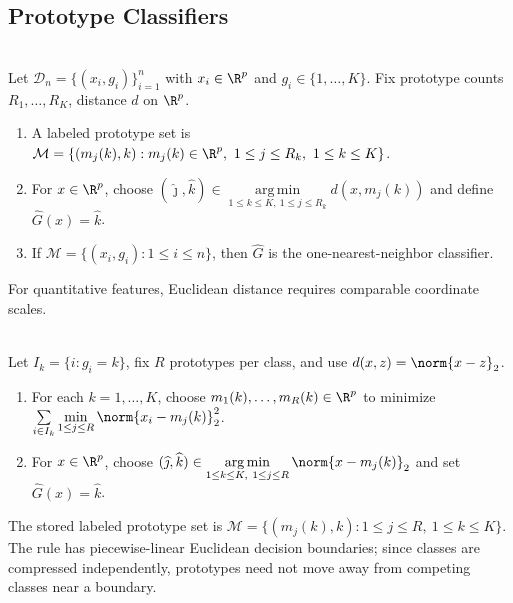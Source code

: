 \subsection{Prototype Classifiers}

\begin{definition} \label{def:sl-prototype-classifier} \\
Let $\mathcal{D}_n=\{(x_i,g_i)\}_{i=1}^n$ with $x_i\in\R^p$ and $g_i\in\{1,\ldots,K\}$.  Fix prototype counts $R_1,\ldots,R_K$, distance $d$ on $\R^p$.
\begin{enumerate}[label=(\roman*)]
\setlength{\itemsep}{0pt}
\item A labeled prototype set is $\mathcal{M}=\{(m_j(k),k):m_j(k)\in\R^p,\ 1\leq j\leq R_k,\ 1\leq k\leq K\}$.
\item For $x\in\R^p$, choose $(\widehat{\jmath},\widehat{k})\in\operatorname*{arg\,min}\limits_{1\leq k\leq K,\ 1\leq j\leq R_k}d(x,m_j(k))$ and define $\widehat{G}(x)=\widehat{k}$.
\item If $\mathcal{M}=\{(x_i,g_i):1\leq i\leq n\}$, then $\widehat{G}$ is the one-nearest-neighbor classifier.
\end{enumerate}
For quantitative features, Euclidean distance requires comparable coordinate scales.
\end{definition}

\begin{method} \label{meth:sl-kmeans-prototype-classifier} \\
Let $I_k=\{i:g_i=k\}$, fix $R$ prototypes per class, and use $d(x,z)=\norm{x-z}_2$.
\begin{enumerate}[label=(\roman*)]
\setlength{\itemsep}{0pt}
\item For each $k=1,\ldots,K$, choose $m_1(k),\ldots,m_R(k)\in\R^p$ to minimize $\sum\limits_{i\in I_k}\min\limits_{1\leq j\leq R}\norm{x_i-m_j(k)}_2^2$.
\item For $x\in\R^p$, choose $(\widehat{\jmath},\widehat{k})\in\operatorname*{arg\,min}\limits_{1\leq k\leq K,\ 1\leq j\leq R}\norm{x-m_j(k)}_2$ and set $\widehat{G}(x)=\widehat{k}$.
\end{enumerate}
The stored labeled prototype set is $\mathcal{M}=\{(m_j(k),k):1\leq j\leq R,\ 1\leq k\leq K\}$.\\
The rule has piecewise-linear Euclidean decision boundaries; since classes are compressed independently, prototypes need not move away from competing classes near a boundary.
\end{method}


